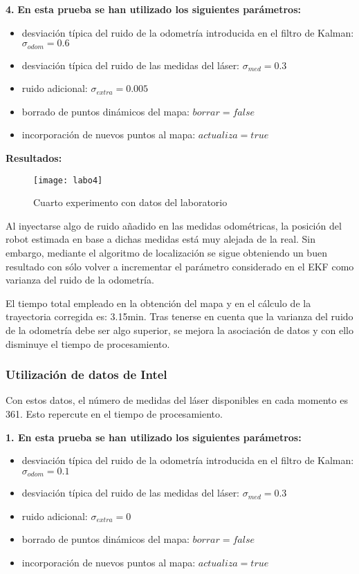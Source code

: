 \textbf{4.} \textbf{En esta prueba se han utilizado los siguientes parámetros:}
\begin{itemize}
  \item desviación típica del ruido de la odometría introducida en el filtro de Kalman: $\sigma_{odom} = 0.6$
  \item desviación típica del ruido de las medidas del láser: $\sigma_{med} = 0.3$
  \item ruido adicional: $\sigma_{extra} = 0.005$
  \item borrado de puntos dinámicos del mapa: $borrar = false$
  \item incorporación de nuevos puntos al mapa: $actualiza = true$
\end{itemize}


\textbf{Resultados:}

\begin{figure}[h]
  \centering\texttt{[image: labo4]}\\
  \caption{Cuarto experimento con datos del laboratorio}\label{fg:labo4}
\end{figure}

Al inyectarse algo de ruido añadido en las medidas odométricas, la posición del robot estimada en base a dichas medidas está muy alejada de la real. Sin embargo, mediante el algoritmo de localización se sigue obteniendo un buen resultado con sólo volver a incrementar el parámetro considerado en el EKF como varianza del ruido de la odometría.

El tiempo total empleado en la obtención del mapa y en el cálculo de la trayectoria corregida es: 3.15min. Tras tenerse en cuenta que la varianza del ruido de la odometría debe ser algo superior, se mejora la asociación de datos y con ello disminuye el tiempo de procesamiento.


\subsubsection{Utilización de datos de Intel}
Con estos datos, el número de medidas del láser disponibles en cada momento es 361. Esto repercute en el tiempo de procesamiento.

\noindent
\textbf{\textbf{1.} En esta prueba se han utilizado los siguientes parámetros:}
\begin{itemize}
  \item desviación típica del ruido de la odometría introducida en el filtro de Kalman: $\sigma_{odom} = 0.1$
  \item desviación típica del ruido de las medidas del láser: $\sigma_{med} = 0.3$
  \item ruido adicional: $\sigma_{extra} = 0$
  \item borrado de puntos dinámicos del mapa: $borrar = false$
  \item incorporación de nuevos puntos al mapa: $actualiza = true$
\end{itemize}


